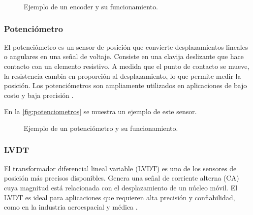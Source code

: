 \begin{figure}[h!]
	\centering
	\caption{Ejemplo de un encoder y su funcionamiento.}
	\label{fig:encoder}
\end{figure}

\subsubsection{Potenciómetro}
El potenciómetro es un sensor de posición que convierte desplazamientos lineales o angulares en una señal de voltaje. Consiste en una clavija deslizante que hace contacto con un elemento resistivo. A medida que el punto de contacto se mueve, la resistencia cambia en proporción al desplazamiento, lo que permite medir la posición. Los potenciómetros son ampliamente utilizados en aplicaciones de bajo costo y baja precisión \cite{Potenciometro}.

En la \autoref{fig:potenciometros} se muestra un ejemplo de este sensor.

\begin{figure}[h!]
	\centering
	\caption{Ejemplo de un potenciómetro y su funcionamiento.}
	\label{fig:potenciometros}
\end{figure}

\subsubsection{LVDT}
El transformador diferencial lineal variable (LVDT) es uno de los sensores de posición más precisos disponibles. Genera una señal de corriente alterna (CA) cuya magnitud está relacionada con el desplazamiento de un núcleo móvil. El LVDT es ideal para aplicaciones que requieren alta precisión y confiabilidad, como en la industria aeroespacial y médica \cite{LVDT}.

